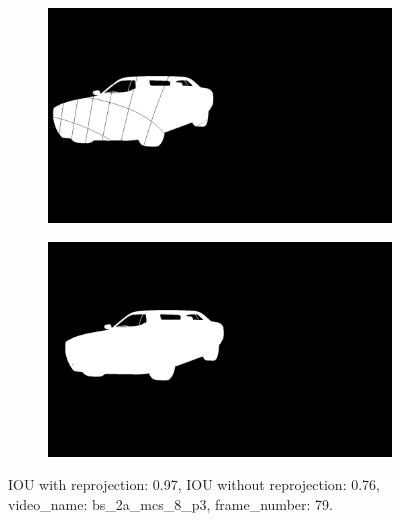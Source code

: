 \begin{figure}
\begin{subfigure}[t]{0.19\textwidth}
\end{subfigure}
\begin{subfigure}[t]{0.19\textwidth}
\centering
\includegraphics[scale=0.07]{good_examples/visual_34430_w_np.png}
\end{subfigure}
\begin{subfigure}[t]{0.19\textwidth}
\centering
\includegraphics[scale=0.07]{good_examples/visual_34430_wo_np.png}
\end{subfigure}
\caption{IOU with reprojection: 0.97, IOU without reprojection: 0.76, video\_name: bs\_2a\_mcs\_8\_p3, frame\_number: 79.}
\end{figure}

